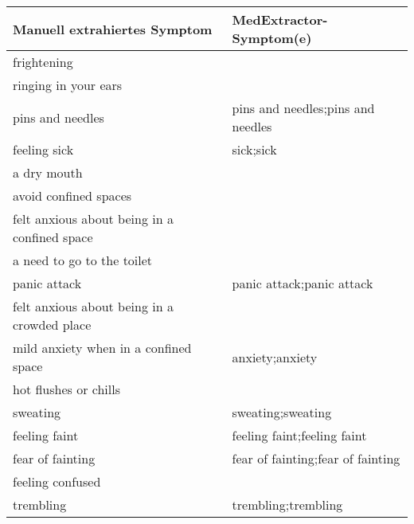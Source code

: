 \begin{table}[H]
\begin{center}
\begin{tabular}{ll}
\toprule
                      Manuell extrahiertes Symptom &       MedExtractor-Symptom(e) \\
\midrule
                                 frightening &                                                    \\
                        ringing in your ears &                                                    \\
                            pins and needles &                  pins and needles;pins and needles \\
                                feeling sick &                                          sick;sick \\
                                 a dry mouth &                                                    \\
                       avoid confined spaces &                                                    \\
felt anxious about being in a confined space &                                                    \\
                  a need to go to the toilet &                                                    \\
                                panic attack &                          panic attack;panic attack \\
 felt anxious about being in a crowded place &                                                    \\
       mild anxiety when in a confined space &                                    anxiety;anxiety \\
                       hot flushes or chills &                                                    \\
                                    sweating &                                  sweating;sweating \\
                               feeling faint &                        feeling faint;feeling faint \\
                            fear of fainting &                  fear of fainting;fear of fainting \\
                            feeling confused &                                                    \\
                                   trembling &                                trembling;trembling \\

\end{tabular}
\end{center}
\end{table}
